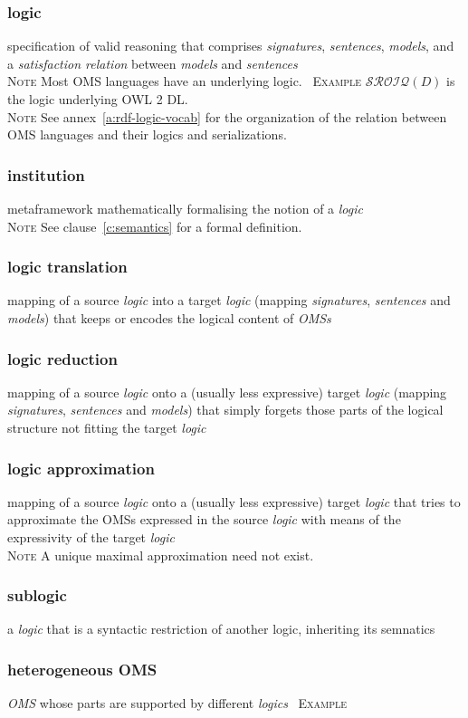 \documentclass[10pt,%
\ifpretendfinal
final%
\else
draft%
\fi,
]{scrreprt}
\newcommand*{\termref}[1]{\textit{#1}}
\newcommand{\termdefinition}[2]{\subsubsection*{\normalsize #1}#2}
\newenvironment{definitions}[0]{\medskip }{}
\newenvironment{note}[0]{\ \\ \textsc{Note} \quad}{}
\newenvironment{example}[0]{\ \newline \textsc{Example}\quad }{}
\begin{document}
\begin{definitions}
  \termdefinition{logic}{specification of valid reasoning that comprises \termref{signatures}, \termref{sentences},
  \termref{models}, and a \termref{satisfaction relation} between \termref{models} and \termref{sentences}}
  \begin{note}
    Most OMS languages have an underlying logic.
  \end{note}
  \begin{example}
    $\mathcal{SROIQ}(D)$ is the logic underlying OWL 2 DL.
  \end{example}
  \begin{note}
   See annex~\ref{a:rdf-logic-vocab} for the organization of the
   relation between OMS languages and their logics and serializations.
  \end{note}

 \termdefinition{institution}{metaframework mathematically formalising
the notion of a \termref{logic}}
\begin{note}
 See clause~\ref{c:semantics} for a formal definition.
\end{note}

  \termdefinition{logic translation}{mapping of a source
    \termref{logic} into a target \termref{logic} (mapping
    \termref{signatures}, \termref{sentences} and \termref{models})
    that keeps or encodes the logical content of \termref{OMSs}}

  \termdefinition{logic reduction}{mapping of a source \termref{logic}
    onto a (usually less expressive) target \termref{logic} (mapping
    \termref{signatures}, \termref{sentences} and \termref{models})
    that simply forgets those parts of the logical structure not
    fitting the target \termref{logic}}

\termdefinition{logic approximation}{mapping of a source \termref{logic}
  onto a (usually less expressive) target \termref{logic} that tries
  to approximate the OMSs expressed in the source \termref{logic} with
  means of the expressivity of the target \termref{logic}}
\begin{note}
  A unique maximal approximation need not exist.
\end{note}

\termdefinition{sublogic}{a \termref{logic} that is a syntactic restriction of another logic, inheriting its semnatics}

  \termdefinition{heterogeneous OMS}{\termref{OMS} whose parts are supported by different \termref{logics}}
\begin{example}
\end{example}

\end{definitions}
  
\end{document}
